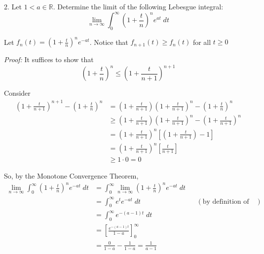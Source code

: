 \documentclass[12pt]{report}
\newcommand{\R}{\mathbb{R}}
\newenvironment*{proof}[1][blue]{
\begin{tcolorbox}[
    parbox=false,
    colback=#1!5!white,
    colframe=#1!75!black,
    breakable
]}
{\end{tcolorbox}}
\begin{document}
    \color{black}


\pagebreak 

2. Let $1 < a \in \R$. Determine the limit of the following Lebesgue integral:
\[\lim_{n \to \infty} \int_0^{\infty} (1 + \frac{t}{n})^n e^{at}\; dt\]

    \color{blue}
        Let $f_n(t) = (1 + \frac{t}{n})^n e^{-at}$. Notice that $f_{n+1}(t) \geq f_{n}(t)$ for all $t \geq 0$

        \begin{proof}
            \emph{Proof:} It suffices to show that 
            \[(1 + \frac{t}{n})^n \leq (1 + \frac{t}{n+1})^{n+1}\]

            Consider  
            \begin{align}
                (1 + \frac{t}{n+1})^{n+1} - (1 + \frac{t}{n})^{n} &= (1 + \frac{t}{n+1})(1 + \frac{t}{n+1})^n - (1 + \frac{t}{n})^{n}\\ 
                &\geq (1 + \frac{t}{n+1})(1 + \frac{t}{n+1})^n - (1 + \frac{t}{n+1})^{n}\\ 
                &= (1 + \frac{t}{n+1})^n[(1 + \frac{t}{n+1}) - 1]\\
                &= (1 + \frac{t}{n+1})^n[\frac{t}{n+1}]\\
                &\geq 1 \cdot 0 = 0
            \end{align}
        \end{proof}

        So, by the Monotone Convergence Theorem,
        \begin{align*}
            \lim_{n \to \infty} \int_0^{\infty} (1 + \frac{t}{n})^n e^{-at}\; dt &= \int_0^{\infty} \lim_{n \to \infty} (1 + \frac{t}{n})^n e^{-at}\; dt \\ 
            &= \int_0^{\infty} e^t e^{-at} \; dt && (\text{by definition of exp})\\
            &= \int_0^{\infty} e^{-(a-1)t} \; dt\\
            &= \left[\frac{e^{-(a-1)t}}{1 - a}\right]_0^{\infty}\\ 
            &= \frac{0}{1-a} - \frac{1}{1-a} = \boxed{\frac{1}{a-1}}
        \end{align*}
    \color{black}
\pagebreak 
\end{document}
